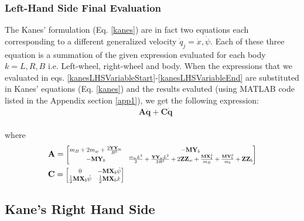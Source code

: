 \documentclass[a4paper,10pt]{article}
\newcommand\scalemath[2]{\scalebox{#1}{\mbox{\ensuremath{\displaystyle #2}}}}
\begin{document}
\subsubsection{Left-Hand Side Final Evaluation}
The Kanes' formulation (Eq. \ref{kanes}) are in fact two equations each corresponding to a different generalized velocity
${\dot{q}_j} = {\dot{x},\dot\psi}$. Each of these three equation is a summation of the given expression evaluated
for each body ${k}={L,R,B}$ i.e. Left-wheel, right-wheel and body. When the expressions that we evaluated in eqs. 
\ref{kanesLHSVariableStart}-\ref{kanesLHSVariableEnd} are substituted in Kanes' equations (Eq. \ref{kanes}) and the results 
evaluted (using MATLAB code listed in the Appendix section \ref{app1}), we get the following expression:
\begin{align}
 &\mathbf{A\ddot{q}+C\dot{q}} \nonumber
\end{align}\\
where
\begin{align} \begin{split}
 &\mathbf{A}=\scalemath{0.75}{\left[\begin{matrix}
  m_B+2m_w+\frac{2\mathbf{YY}_w}{R^2} &
  -\mathbf{MY}_b \\
  -\mathbf{MY}_b &
  \frac{m_wL^2}{2}+\frac{\mathbf{YY}_wL^2}{2R^2}+2\mathbf{ZZ}_w + \frac{\mathbf{MX}_b^2}{m_B} + \frac{\mathbf{MY}_b^2}{m_b}  + \mathbf{ZZ}_b\\
  \end{matrix}\right]}  \\
 &\mathbf{C}=\scalemath{0.75}{\left[\begin{matrix}
  0 &
  -\mathbf{MX}_b\dot\psi \\
  \frac{1}{2}\mathbf{MX}_b\dot\psi &  
  \frac{1}{2}\mathbf{MX}_b\dot{x} \\
 \end{matrix}\right]} \label{kanesAC}
\end{split}\end{align}

\subsection{Kane's Right Hand Side}
\end{document}
